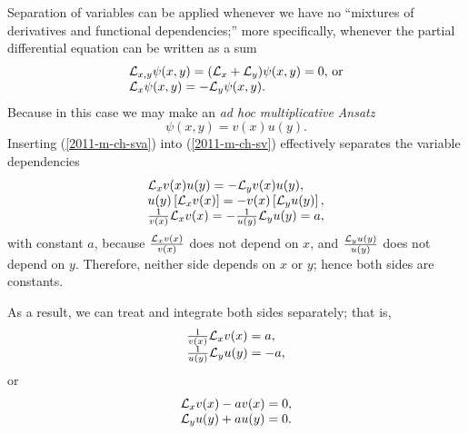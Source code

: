Separation of variables can be applied whenever we have no ``mixtures of derivatives and functional dependencies;''
more specifically,
whenever the  partial differential equation can be written as a sum
\begin{equation}
\begin{array}  {l}
{\cal L}_{x,y} \psi(x,y) = ({\cal L}_{x} + {\cal L}_y)\psi (x,y) =  0\textrm{, or}  \\
{\cal L}_{x} \psi (x,y) =  - {\cal L}_y \psi (x,y).
\end{array}
\label{2011-m-ch-sveq}
\end{equation}
Because in this case we may make an {\it ad hoc} {\em multiplicative}
{\it Ansatz}
\begin{equation}
\psi (x,y)= v(x)u(y) .
\label{2011-m-ch-sva}
\end{equation}
Inserting (\ref{2011-m-ch-sva}) into (\ref{2011-m-ch-sv}) effectively  separates the variable dependencies
\begin{equation}
\begin{array}  {l}
{\cal L}_{x} v(x)u(y) =   - {\cal L}_y v(x)u(y), \\
u(y)\left[ {\cal L}_{x} v(x)\right]
 =   -  v(x)\left[{\cal L}_y u(y)\right]
, \\
\frac{1}{v(x)}{\cal L}_{x} v(x) =   - \frac{1}{u(y)}{\cal L}_y u(y)=a,
\end{array}
\label{2011-m-ch-sv1}
\end{equation}
with constant $a$, because
$\frac{{\cal L}_{x} v(x)}{v(x)}$  does not depend on $x$,
and  $\frac{{\cal L}_y u(y)}{u(y)}$  does not depend on $y$.
Therefore,
neither side depends on $x$ or $y$; hence both sides are constants.

As a result, we can treat and integrate both sides separately; that is,
\begin{equation}
\begin{array}  {l}
\frac{1}{v(x)} {\cal L}_{x} v(x)= a,\\
\frac{1}{u(y)}{\cal L}_y u(y)=-a
,
\end{array}
\label{2011-m-ch-sv2}
\end{equation}
or
\begin{equation}
\begin{array}  {l}
{\cal L}_{x} v(x)- av(x)=0,\\
{\cal L}_y u(y)+a u(y) = 0
.
\end{array}
\label{2011-m-ch-sv2or}
\end{equation}


